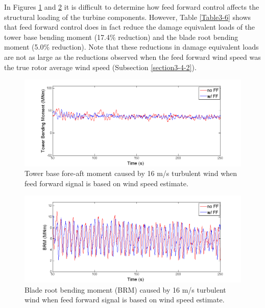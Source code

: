 In Figures \ref{fig3-34} and \ref{fig3-35} it is difficult to determine how feed forward control affects the structural loading of the turbine components. However, Table \ref{Table3-6} shows that feed forward control does in fact reduce the damage equivalent loads of the tower base bending moment (17.4$\%$ reduction) and the blade root bending moment (5.0$\%$ reduction). Note that these reductions in damage equivalent loads are not as large as the reductions observed when the feed forward wind speed was the true rotor average wind speed (Subsection \ref{section3-4-2}). 

\begin{figure}[htb]
	\centering
		\includegraphics[width = \linewidth]{Figures/ch3Figures/fig3-34.png}
		
	\caption{Tower base fore-aft moment caused by 16 m/s turbulent wind when feed forward signal is based on wind speed estimate.}
	\label{fig3-34}
\end{figure}

\begin{figure}[htb]
	\centering
		\includegraphics[width = \linewidth]{Figures/ch3Figures/fig3-35.png}
		
	\caption{Blade root bending moment (BRM) caused by 16 m/s turbulent wind when feed forward signal is based on wind speed estimate.}
	\label{fig3-35}
\end{figure}


